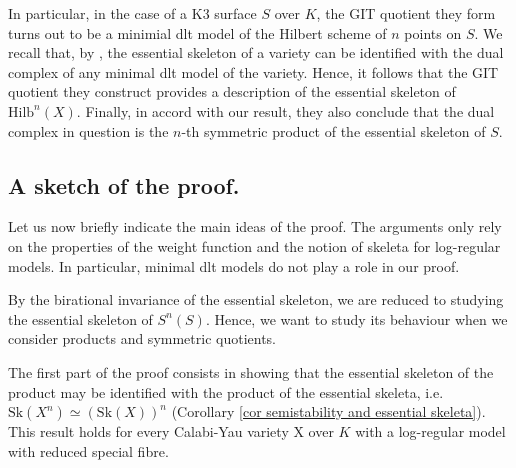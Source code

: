 \documentclass{amsart}%
\numberwithin{equation}{subsection}
\theoremstyle{plain2}
\theoremstyle{definition2}
\theoremstyle{stepstyle}
\theoremstyle{point}
\theoremstyle{subpoint}
\newcommand{\Hilb}{\ensuremath{\mathrm{Hilb}}}
\newcommand{\Sk}{\mathrm{Sk}}
\begin{document}
In particular, in the case of a $\text{K}3$ surface $S$ over $K$, the GIT quotient they form turns out to be a minimial dlt model of the Hilbert scheme of $n$ points on $S$. We recall that, by \cite{NicaiseXu}, the essential skeleton of a variety can be identified with the dual complex of any minimal dlt model of the variety. Hence, it follows that the GIT quotient they construct provides a description of the essential skeleton of $\Hilb^n(X)$. Finally, in accord with our result, they also conclude that the dual complex in question is the $n$-th symmetric product of the essential skeleton of $S$.

\subsection{A sketch of the proof.} Let us now briefly indicate the main ideas of the proof. The arguments only rely on the properties of the weight function and the notion of skeleta for log-regular models. In particular, minimal dlt models do not play a role in our proof. 

By the birational invariance of the essential skeleton, we are reduced to studying the essential skeleton of $S^n(S)$. Hence, we want to study its behaviour when we consider products and symmetric quotients.

The first part of the proof consists in showing that the essential skeleton of the product may be identified with the product of the essential skeleta, i.e. $\Sk(X^n) \simeq (\Sk(X))^n$ (Corollary \ref{cor semistability and essential skeleta}). This result holds for every Calabi-Yau variety X over $K$ with a log-regular model with reduced special fibre.
\end{document}
